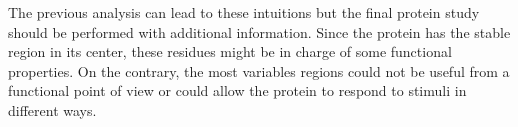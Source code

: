 The previous analysis can lead to these intuitions but the final protein study should be performed with additional information. Since the protein has the stable region in its center, these residues might be in charge of some functional properties. On the contrary, the most variables regions could not be useful from a functional point of view or could allow the protein to respond to stimuli in different ways.